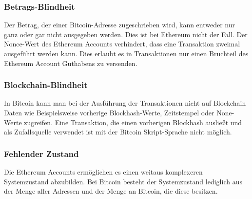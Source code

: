 \subsubsection{Betrags-Blindheit}
Der Betrag, der einer Bitcoin-Adresse zugeschrieben wird, kann entweder nur ganz oder gar nicht ausgegeben werden. Dies ist bei Ethereum nicht der Fall. Der Nonce-Wert des Ethereum Accounts verhindert, dass eine Transaktion zweimal ausgeführt werden kann. Dies erlaubt es in Transaktionen nur einen Bruchteil des Ethereum Account Guthabens zu versenden.
\subsubsection{Blockchain-Blindheit}
In Bitcoin kann man bei der Ausführung der Transaktionen nicht auf Blockchain Daten wie Beispielsweise vorherige Blockhash-Werte, Zeitstempel oder None-Werte zugreifen. Eine Transaktion, die einen vorherigen Blockhash ausließt und als Zufallsquelle verwendet ist mit der Bitcoin Skript-Sprache nicht möglich.
\subsubsection{Fehlender Zustand}
Die Ethereum Accounts ermöglichen es einen weitaus komplexeren Systemzustand abzubilden. Bei Bitcoin besteht der Systemzustand lediglich aus der Menge aller Adressen und der Menge an Bitcoin, die diese besitzen.